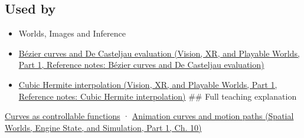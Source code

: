 \subsection{Used by}\label{appendix-f28eeec97a3d-used-by}

\hypertarget{appendix-f28eeec97a3d-used-by}{}

\begin{itemize}
\item
  {Worlds, Images and Inference}
\item
  \href{../07-Vision-XR-and-Playable-Worlds-P01/main.pdf\#nameddest=appendix-ddbec701898c}{Bézier curves and De Casteljau evaluation (Vision, XR, and Playable Worlds, Part 1, Reference notes: Bézier curves and De Casteljau evaluation)}
\item
  \href{../07-Vision-XR-and-Playable-Worlds-P01/main.pdf\#nameddest=appendix-db3aef8f2fd6}{Cubic Hermite interpolation (Vision, XR, and Playable Worlds, Part 1, Reference notes: Cubic Hermite interpolation)} \#\# Full teaching explanation
\end{itemize}

\hyperref[03-visual-computing-i-ch001-curves-as-controllable-functions]{Curves as controllable functions} · \href{../05-Spatial-Worlds-Engine-State-and-Simulation-P01/main.pdf\#nameddest=04-visual-computing-ii-ch029-animation-curves-and-motion-paths}{Animation curves and motion paths (Spatial Worlds, Engine State, and Simulation, Part 1, Ch. 10)}
